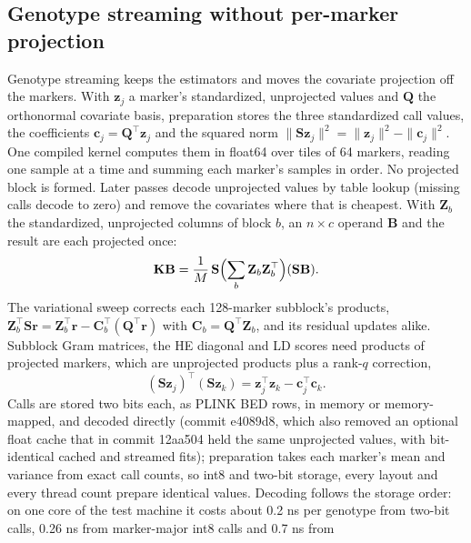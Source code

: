 \documentclass[11pt]{article}
\newcommand{\K}{\mathbf{K}}
\begin{document}
\subsection{Genotype streaming without per-marker projection}
\label{sec:streaming-methods}

Genotype streaming keeps the estimators and moves the covariate
projection off the markers. With $\mathbf z_j$ a marker's
standardized, unprojected values and $\mathbf Q$ the orthonormal
covariate basis, preparation stores the three standardized call values,
the coefficients $\mathbf c_j=\mathbf Q^\top\mathbf z_j$ and the squared
norm $\|\mathbf S\mathbf z_j\|^2=\|\mathbf z_j\|^2-\|\mathbf c_j\|^2$. One
compiled kernel computes them in float64 over tiles of 64 markers,
reading one sample at a time and summing each marker's samples in order.
No projected block is formed. Later passes decode unprojected values by
table lookup (missing calls decode to zero) and remove the covariates where
that is cheapest. With $\mathbf Z_b$ the standardized, unprojected columns
of block $b$, an $n\times c$ operand $\mathbf B$ and the result are each
projected once:
\begin{equation}
 \K\mathbf B=\frac1M\,\mathbf S\Bigl(\sum_b\mathbf Z_b\mathbf Z_b^\top\Bigr)(\mathbf S\mathbf B).
 \label{eq:rhs-projection}
\end{equation}
The variational sweep
corrects each 128-marker subblock's products,
$\mathbf Z_b^\top\mathbf S\mathbf r=\mathbf Z_b^\top\mathbf r-\mathbf C_b^\top(\mathbf Q^\top\mathbf r)$
with $\mathbf C_b=\mathbf Q^\top\mathbf Z_b$, and its residual updates
alike. Subblock Gram matrices, the HE diagonal and LD scores need
products of projected markers, which are unprojected products plus a
rank-$q$ correction,
\begin{equation}
 (\mathbf S\mathbf z_j)^\top(\mathbf S\mathbf z_k)
 =\mathbf z_j^\top\mathbf z_k-\mathbf c_j^\top\mathbf c_k .
 \label{eq:rank-q}
\end{equation}
Calls are stored two bits each, as PLINK BED rows, in memory or
memory-mapped, and decoded directly (commit e4089d8, which also removed an
optional float cache that in commit 12aa504 held the same unprojected
values, with bit-identical cached and streamed fits); preparation takes each marker's mean and variance from exact
call counts, so int8 and two-bit storage, every layout and every thread
count prepare identical values. Decoding follows the storage order: on
one core of the test machine it costs about 0.2 ns per genotype from
two-bit calls, 0.26 ns from marker-major int8 calls and 0.7 ns from
\end{document}
